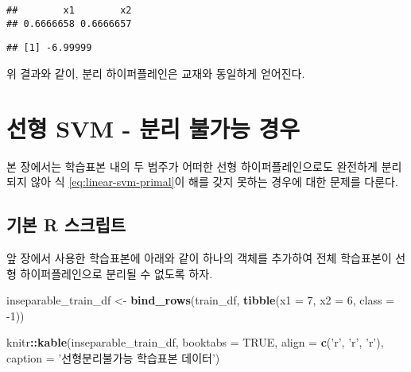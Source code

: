 \documentclass[]{book}
\newenvironment{Shaded}{\begin{snugshade}}{\end{snugshade}}
\newcommand{\DataTypeTok}[1]{\textcolor[rgb]{0.13,0.29,0.53}{#1}}
\newcommand{\DecValTok}[1]{\textcolor[rgb]{0.00,0.00,0.81}{#1}}
\newcommand{\KeywordTok}[1]{\textcolor[rgb]{0.13,0.29,0.53}{\textbf{#1}}}
\newcommand{\NormalTok}[1]{#1}
\newcommand{\OperatorTok}[1]{\textcolor[rgb]{0.81,0.36,0.00}{\textbf{#1}}}
\newcommand{\OtherTok}[1]{\textcolor[rgb]{0.56,0.35,0.01}{#1}}
\newcommand{\StringTok}[1]{\textcolor[rgb]{0.31,0.60,0.02}{#1}}
\begin{document}
\begin{verbatim}
##        x1        x2 
## 0.6666658 0.6666657
\end{verbatim}

\begin{Shaded}
\end{Shaded}

\begin{verbatim}
## [1] -6.99999
\end{verbatim}

위 결과와 같이, 분리 하이퍼플레인은 교재와 동일하게 얻어진다.

\hypertarget{linear-svm-inseparable}{%
\section{선형 SVM - 분리 불가능 경우}\label{linear-svm-inseparable}}

본 장에서는 학습표본 내의 두 범주가 어떠한 선형 하이퍼플레인으로도 완전하게 분리되지 않아 식 \eqref{eq:linear-svm-primal}이 해를 갖지 못하는 경우에 대한 문제를 다룬다.

\hypertarget{linear-svm-inseparable-basic-script}{%
\subsection{기본 R 스크립트}\label{linear-svm-inseparable-basic-script}}

앞 장에서 사용한 학습표본에 아래와 같이 하나의 객체를 추가하여 전체 학습표본이 선형 하이퍼플레인으로 분리될 수 없도록 하자.

\begin{Shaded}
\begin{Highlighting}[]
\NormalTok{inseparable_train_df <-}\StringTok{ }\KeywordTok{bind_rows}\NormalTok{(train_df, }
                                  \KeywordTok{tibble}\NormalTok{(}\DataTypeTok{x1 =} \DecValTok{7}\NormalTok{, }\DataTypeTok{x2 =} \DecValTok{6}\NormalTok{, }\DataTypeTok{class =} \DecValTok{-1}\NormalTok{))}

\NormalTok{knitr}\OperatorTok{::}\KeywordTok{kable}\NormalTok{(inseparable_train_df, }\DataTypeTok{booktabs =} \OtherTok{TRUE}\NormalTok{,}
             \DataTypeTok{align =} \KeywordTok{c}\NormalTok{(}\StringTok{'r'}\NormalTok{, }\StringTok{'r'}\NormalTok{, }\StringTok{'r'}\NormalTok{),}
             \DataTypeTok{caption =} \StringTok{'선형분리불가능 학습표본 데이터'}\NormalTok{)}
\end{Highlighting}
\end{Shaded}
\end{document}
